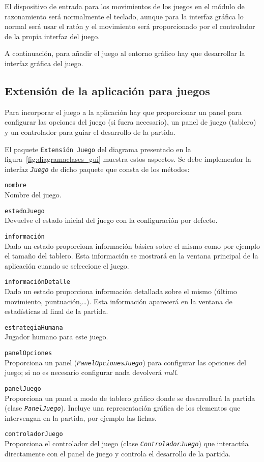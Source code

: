 El dispositivo de entrada para los movimientos de los juegos en el módulo de razonamiento será normalmente el teclado, aunque para la interfaz gráfica lo normal será usar el ratón y el movimiento será proporcionado por el controlador de la propia interfaz del juego.

\bigskip
A continuación, para añadir el juego al entorno gráfico hay que desarrollar la interfaz gráfica del juego.

\subsection{Extensión de la aplicación para juegos}
\label{ssec:extension_aplicacion_juegos}
Para incorporar el juego a la aplicación hay que proporcionar un panel para configurar las opciones del juego (si fuera necesario), un panel de juego (tablero) y un controlador para guiar el desarrollo de la partida.

El paquete \texttt{Extensión Juego} del diagrama presentado en la figura~\ref{fig:diagramaclases_gui} muestra estos aspectos.
Se debe implementar la interfaz \texttt{\textit{Juego}} de dicho paquete que consta de los métodos:
\begin{description}
	\item \texttt{nombre} \\
	Nombre del juego.
	\item \texttt{estadoJuego} \\
	Devuelve el estado inicial del juego con la configuración por defecto.
	\item \texttt{información} \\
	Dado un estado proporciona información básica sobre el mismo como por ejemplo el tamaño del tablero. Esta información se mostrará en la ventana principal de la aplicación cuando se seleccione el juego.
	\item \texttt{informaciónDetalle} \\
	Dado un estado proporciona información detallada sobre el mismo (último movimiento, puntuación,\ldots). Esta información aparecerá en la ventana de estadísticas al final de la partida.
	\item \texttt{estrategiaHumana} \\
	Jugador humano para este juego.
	\item \texttt{panelOpciones} \\
	Proporciona un panel (\texttt{\textit{PanelOpcionesJuego}}) para configurar las opciones del juego; si no es necesario configurar nada devolverá \textit{null}.
	\item \texttt{panelJuego} \\
	Proporciona un panel a modo de tablero gráfico donde se desarrollará la partida (clase \texttt{\textit{PanelJuego}}). Incluye una representación gráfica de los elementos que intervengan en la partida, por ejemplo las fichas.
	\item \texttt{controladorJuego} \\
	Proporciona el controlador del juego (clase \texttt{\textit{ControladorJuego}}) que interactúa directamente con el panel de juego y controla el desarrollo de la partida.
\end{description}

